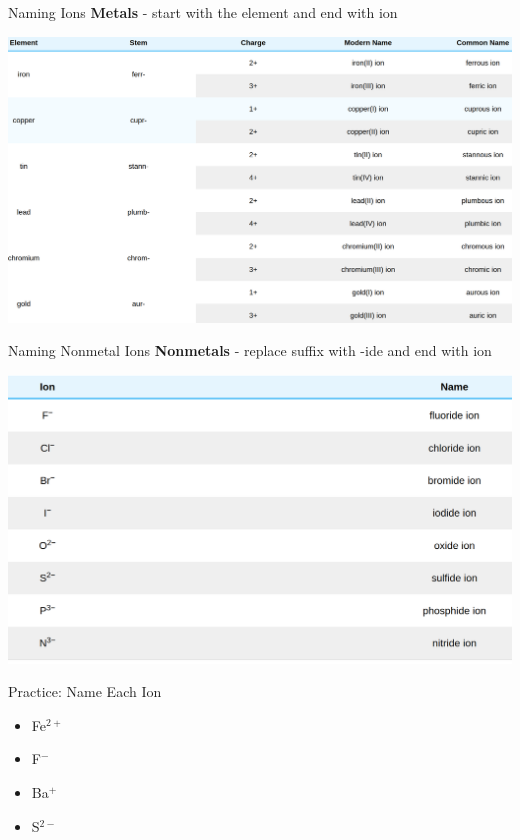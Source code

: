 \documentclass[11pt]{beamer}
\begin{document}
\begin{frame}{Naming Ions}
  \textbf{Metals} - start with the element and end with ion

  \centering
  \includegraphics[width=\linewidth]{ions_names}
\end{frame}

\begin{frame}{Naming Nonmetal Ions}
  \textbf{Nonmetals} - replace suffix with -ide and end with ion

  \centering
  \includegraphics[width=\linewidth]{nonmetal_ions}
\end{frame}

\begin{frame}{Practice: Name Each Ion}
  \begin{itemize}
  \item Fe$^{2+}$
  \item F$^-$
  \item Ba$^+$
  \item S$^{2-}$
  \end{itemize}
\end{frame}
\end{document}
